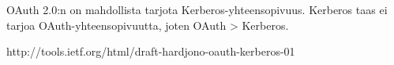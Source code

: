 OAuth 2.0:n on mahdollista tarjota Kerberos-yhteensopivuus. Kerberos taas ei tarjoa OAuth-yhteensopivuutta, joten OAuth > Kerberos.

http://tools.ietf.org/html/draft-hardjono-oauth-kerberos-01
